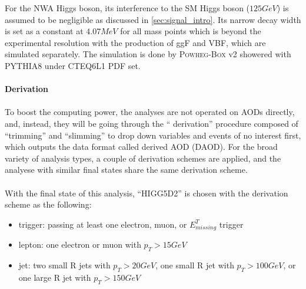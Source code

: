 \noindent
For the NWA Higgs boson, its interference to the SM Higgs boson ($125GeV$) is assumed to be negligible as discussed in \ref{sec:signal_intro}. Its narrow decay width is set as a constant at $4.07MeV$ for all mass points which is beyond the experimental resolution with the production of ggF and VBF, which are simulated separately. The simulation is done by \textsc{Powheg-Box} v2 showered with \textsc{PYTHIA8} under \textsc{CTEQ6L1} PDF set. 
\\
\\{\bf Derivation}
\\
\\To boost the computing power, the analyses are not operated on AODs directly, and, instead, they will be going through the `` derivation'' procedure composed of ``trimming'' and ``slimming'' to drop down variables and events of no interest first, which outputs the data format called derived AOD (DAOD). For the broad variety of analysis types, a couple of derivation schemes are applied, and the analyese with similar final states share the same derivation scheme. 
\\
\\With the final state of this analysis, ``HIGG5D2'' is chosen with the derivation scheme as the following:
\begin{itemize}
  \item trigger: passing at least one electron, muon, or $E^{T}_{missing}$ trigger
  \item lepton: one electron or muon with $p_{T}>15GeV$ 
  \item jet: two small R jets with $p_{T}>20GeV$, one  small R jet with $p_{T}>100GeV$, or one large R jet with $p_{T}>150GeV$
\end{itemize}
